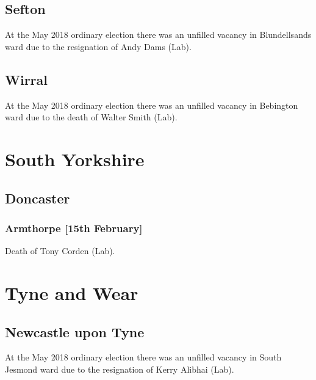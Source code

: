 \documentclass[a4paper,openany]{book}
\begin{document}
\begin{resultsiii}
\subsection*{Sefton}

At the May 2018 ordinary election there was an unfilled vacancy in Blundellsands ward due to the resignation of Andy Dams (Lab).

\subsection*{Wirral}

At the May 2018 ordinary election there was an unfilled vacancy in Bebington ward due to the death of Walter Smith (Lab).

\section{South Yorkshire}

\subsection*{Doncaster}

\subsubsection*{Armthorpe \hspace*{\fill}\nolinebreak[1]%
\enspace\hspace*{\fill}
[15th February]}


Death of Tony Corden (Lab).

\section{Tyne and Wear}

\subsection*{Newcastle upon Tyne}

At the May 2018 ordinary election there was an unfilled vacancy in South Jesmond ward due to the resignation of Kerry Alibhai (Lab).


\end{resultsiii}
\end{document}
